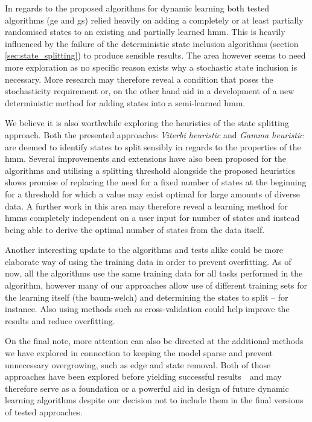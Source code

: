 In regards to the proposed algorithms for dynamic learning both tested algorithms (\acrlong{ge} and \acrlong{gs}) relied heavily on adding a completely or at least partially randomised states to an existing and partially learned \gls{hmm}. This is heavily influenced by the failure of the deterministic state inclusion algorithms (section \ref{sec:state_splitting}) to produce sensible results. The area however seems to need more exploration as no specific reason exists why a stochastic state inclusion is necessary. More research may therefore reveal a condition that poses the stochasticity requirement or, on the other hand aid in a development of a new deterministic method for adding states into a semi-learned \gls{hmm}.

We believe it is also worthwhile exploring the heuristics of the state splitting approach. Both the presented approaches \emph{Viterbi heuristic} and \emph{Gamma heuristic} are deemed to identify states to split sensibly in regards to the properties of the \gls{hmm}. Several improvements and extensions have also been proposed for the algorithms and utilising a splitting threshold alongside the proposed heuristics shows promise of replacing the need for a fixed number of states at the beginning for a threshold for which a value may exist optimal for large amounts of diverse data. A further work in this area may therefore reveal a learning method for \glspl{hmm} completely independent on a user input for number of states and instead being able to derive the optimal number of states from the data itself.

Another interesting update to the algorithms and tests alike could be more elaborate way of using the training data in order to prevent overfitting. As of now, all the algorithms use the same training data for all tasks performed in the algorithm, however many of our approaches allow use of different training sets for the learning itself (the \gls{baum-welch}) and determining the states to split -- for instance. Also using methods such as cross-validation could help improve the results and reduce overfitting.

On the final note, more attention can also be directed at the additional methods we have explored in connection to keeping the model sparse and prevent unnecessary overgrowing, such as edge and state removal. Both of those approaches have been explored before yielding successful results~\cite{bicego2003, bicego2007}~and may therefore serve as a foundation or a powerful aid in design of future dynamic learning algorithms despite our decision not to include them in the final versions of tested approaches.